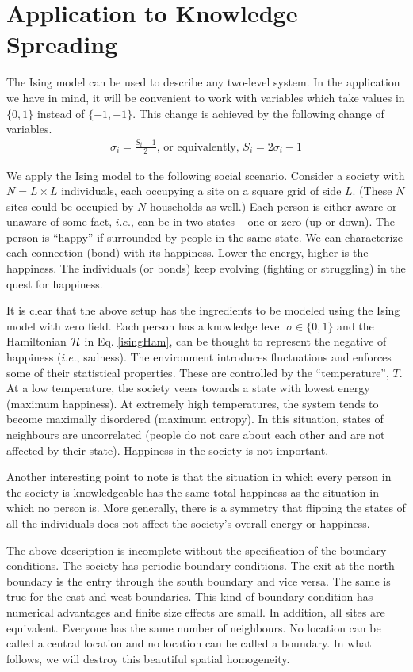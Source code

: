 \documentclass[a4paper,12pt]{article}
\begin{document}
\section{Application to Knowledge Spreading}
The Ising model can be used to describe any two-level system.
In the application we have in mind, it will be convenient to work with
variables which take values in $\{0,1\}$ instead of $\{-1,+1\}$.
This change is achieved by the following change of variables.
\begin{eqnarray}
  \sigma_i=\frac{S_i+1}{2}\mbox{, or equivalently, }
  S_i=2\sigma_i-1
\end{eqnarray}

We apply the Ising model to the following social scenario.
Consider a society with $N=L\times L$ individuals,
each occupying a site
on a square grid of side $L$.
(These $N$ sites could be occupied by $N$ households as well.)
Each person is either aware or unaware of some fact, $i.e$.,
can be in two states -- one or zero (up or down).
The person is ``happy'' if surrounded by people in the same state.
We can characterize each connection (bond) with its happiness.
Lower the energy, higher is the happiness.
The individuals (or bonds) keep evolving (fighting or struggling)
in the quest for happiness.

It is clear that the above setup has the ingredients to be modeled using the
Ising model with zero field. Each person has a knowledge level $\sigma\in\{0,1\}$
and the Hamiltonian $\cal H$ in Eq. \ref{isingHam}, can be thought to
represent the negative of happiness ($i.e.$, sadness).
The environment introduces fluctuations and
enforces some of their statistical properties.
These are controlled by the ``temperature'', $T$.
At a low temperature, the society veers towards a state with lowest energy
(maximum happiness).
At extremely high temperatures, the system tends to become
maximally disordered (maximum entropy).
In this situation, states of neighbours are uncorrelated (people do not care
about each other and are not affected by their state). Happiness in the society is not important.

Another interesting point to note is that the situation in which every person in the society is
knowledgeable has the same total happiness as the situation in which no person is.
More generally, there is a symmetry that flipping the states of all the individuals
does not affect the society's overall energy or happiness.

The above description is incomplete without the specification of the boundary conditions.
The society has periodic boundary conditions. The exit at the north boundary
is the entry through the south boundary and vice versa.
The same is true for the east and west boundaries.
This kind of boundary condition has numerical advantages and finite size effects are small.
In addition, all sites are equivalent.
Everyone has the same number of neighbours.
No location can be called a central location and
no location can be called a boundary.
In what follows, we will destroy this beautiful spatial homogeneity.
\end{document}

